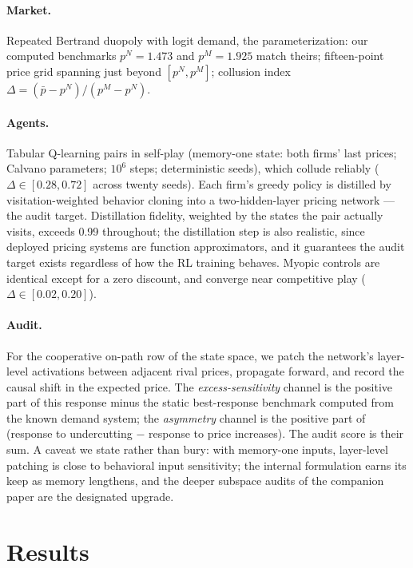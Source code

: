 \documentclass[11pt]{article}
\begin{document}
\paragraph{Market.} Repeated Bertrand duopoly with logit demand, the
\citet{calvano2020} parameterization: our computed benchmarks
$p^N = 1.473$ and $p^M = 1.925$ match theirs; fifteen-point price grid
spanning just beyond $[p^N, p^M]$; collusion index
$\Delta = (\bar p - p^N)/(p^M - p^N)$.

\paragraph{Agents.} Tabular Q-learning pairs in self-play (memory-one
state: both firms' last prices; Calvano parameters; $10^6$ steps;
deterministic seeds), which collude reliably ($\Delta \in [0.28, 0.72]$
across twenty seeds). Each firm's greedy policy is distilled by
visitation-weighted behavior cloning into a two-hidden-layer pricing
network --- the audit target. Distillation fidelity, weighted by the states
the pair actually visits, exceeds 0.99 throughout; the distillation step is
also realistic, since deployed pricing systems are function approximators,
and it guarantees the audit target exists regardless of how the RL training
behaves. Myopic controls are identical except for a zero discount, and
converge near competitive play ($\Delta \in [0.02, 0.20]$).

\paragraph{Audit.} For the cooperative on-path row of the state space, we
patch the network's layer-level activations between adjacent rival prices,
propagate forward, and record the causal shift in the expected price. The
\emph{excess-sensitivity} channel is the positive part of this response
minus the static best-response benchmark computed from the known demand
system; the \emph{asymmetry} channel is the positive part of
(response to undercutting $-$ response to price increases). The audit
score is their sum. A caveat we state rather than bury: with memory-one
inputs, layer-level patching is close to behavioral input sensitivity;
the internal formulation earns its keep as memory lengthens, and the
deeper subspace audits of the companion paper are the designated upgrade.

\section{Results}\label{sec:results}
\end{document}
